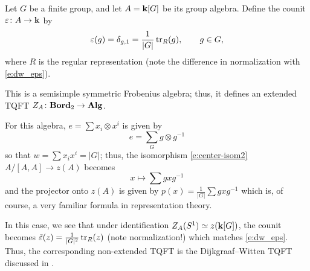 \begin{example}\label{x:DW-extended}
  Let $G$ be a finite group, and let $A=\mathbf{k}[G]$ be its group algebra.
  Define the counit $\varepsilon\colon A\to \mathbf{k}$ by
  $$
  \varepsilon(g)=\delta_{g,1} = \frac{1}{|G|}\operatorname{tr}_R(g), \qquad g\in G,
  $$
  where $R$ is the regular representation (note the difference in normalization
  with \eqref{e:dw_eps}).

  This is a semisimple symmetric Frobenius algebra; thus, it defines an extended
  TQFT $Z_A\colon \mathbf{Bord}_2\to \mathbf{Alg}$.

  For this algebra, $e=\sum x_i\otimes x^i$ is given by
  $$
  e=\sum_G g\otimes g^{-1}
  $$
  so that $w=\sum x_ix^i=|G|$; thus, the isomorphism \eqref{e:center-isom2}
  $A/[A,A]\to z(A)$ becomes
  $$
    x\mapsto \sum gxg^{-1}
  $$
  and the projector onto $z(A)$ is given by $p(x)=\frac{1}{|G|} \sum gxg^{-1}$
  which is, of course, a very familiar formula in representation theory.

  In this case, we see that under identification $Z_A(S^1)\simeq
  z(\mathbf{k}[G])$, the counit becomes $\tilde {\varepsilon}(z)=\frac{1}{|G|^2}\operatorname{tr}_R(z)$
  (note normalization!) which matches \eqref{e:dw_eps}. Thus, the
  corresponding non-extended TQFT is the Dijkgraaf--Witten TQFT discussed in
  .
\end{example}







\clearpage
